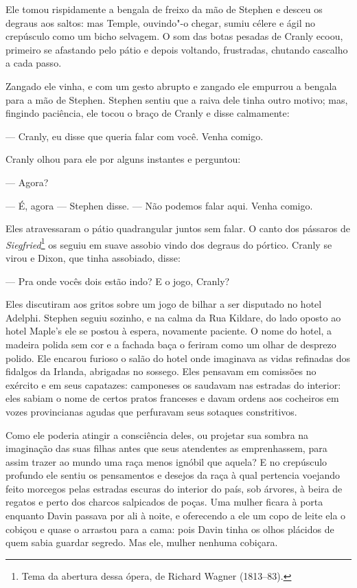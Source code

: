 Ele tomou rispidamente a bengala de freixo da mão de Stephen e desceu os
degraus aos saltos: mas Temple, ouvindo"-o chegar, sumiu célere e ágil
no crepúsculo como um bicho selvagem. O som das botas pesadas de Cranly
ecoou, primeiro se afastando pelo pátio e depois voltando, frustradas,
chutando cascalho a cada passo.

Zangado ele vinha, e com um gesto abrupto e zangado ele empurrou a
bengala para a mão de Stephen. Stephen sentiu que a raiva dele tinha
outro motivo; mas, fingindo paciência, ele tocou o braço de Cranly e
disse calmamente:

 --- Cranly, eu disse que queria falar com você. Venha comigo.

Cranly olhou para ele por alguns instantes e perguntou:

 --- Agora?

 --- É, agora --- Stephen disse. --- Não podemos falar aqui. Venha comigo.

Eles atravessaram o pátio quadrangular juntos sem falar. O canto dos
pássaros de \textit{Siegfried}\footnote{ Tema da abertura dessa ópera, de Richard Wagner
(1813--83).} os seguiu em suave assobio vindo dos degraus do pórtico.
Cranly se virou e Dixon, que tinha assobiado, disse:

 --- Pra onde vocês dois estão indo? E o jogo, Cranly?

Eles discutiram aos gritos sobre um jogo de bilhar a ser disputado no
hotel Adelphi. Stephen seguiu sozinho, e na calma da Rua Kildare, do
lado oposto ao hotel Maple’s ele se postou à espera, novamente
paciente. O nome do hotel, a madeira polida sem cor e a fachada baça o
feriram como um olhar de desprezo polido. Ele encarou furioso o salão
do hotel onde imaginava as vidas refinadas dos fidalgos da Irlanda,
abrigadas no sossego. Eles pensavam em comissões no exército e em seus
capatazes: camponeses os saudavam nas estradas do interior: eles sabiam
o nome de certos pratos franceses e davam ordens aos cocheiros em vozes   
provincianas agudas que perfuravam seus sotaques constritivos.

Como ele poderia atingir a consciência deles, ou projetar sua sombra na
imaginação das suas filhas antes que seus atendentes as emprenhassem,
para assim trazer ao mundo uma raça menos ignóbil que aquela? E no
crepúsculo profundo ele sentiu os pensamentos e desejos da raça à qual
pertencia voejando feito morcegos pelas estradas escuras do interior do
país, sob árvores, à beira de regatos e perto dos charcos salpicados de
poças. Uma mulher ficara à porta enquanto Davin passava por ali à
noite, e oferecendo a ele um copo de leite ela o cobiçou e quase o
arrastou para a cama: pois Davin tinha os olhos plácidos de quem sabia
guardar segredo. Mas ele, mulher nenhuma cobiçara.

